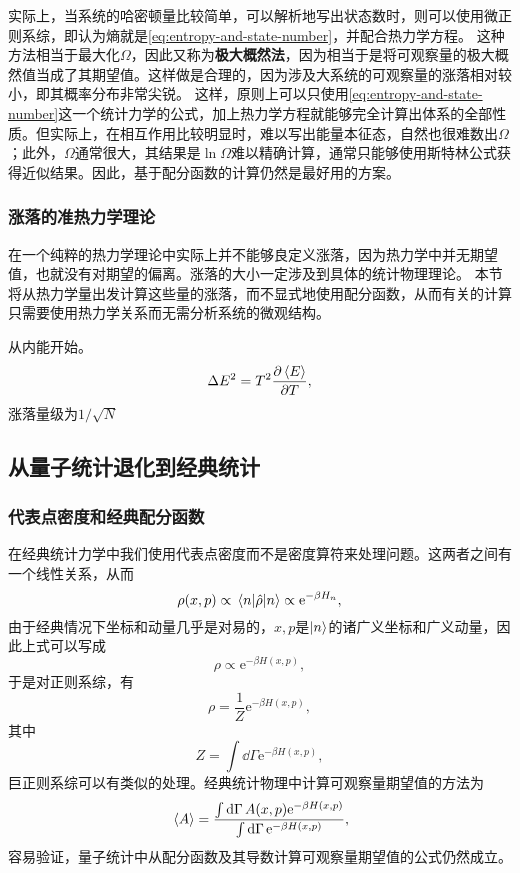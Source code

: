 \documentclass[hyperref, UTF8, a4paper]{ctexart}
\newcommand*{\ee}{\mathrm{e}}
\begin{document}
实际上，当系统的哈密顿量比较简单，可以解析地写出状态数时，则可以使用微正则系综，即认为熵就是\eqref{eq:entropy-and-state-number}，并配合热力学方程。
这种方法相当于最大化$\Omega$，因此又称为\textbf{极大概然法}，因为相当于是将可观察量的极大概然值当成了其期望值。这样做是合理的，因为涉及大系统的可观察量的涨落相对较小，即其概率分布非常尖锐。
这样，原则上可以只使用\eqref{eq:entropy-and-state-number}这一个统计力学的公式，加上热力学方程就能够完全计算出体系的全部性质。但实际上，在相互作用比较明显时，难以写出能量本征态，自然也很难数出$\Omega$；此外，$\Omega$通常很大，其结果是$\ln \Omega$难以精确计算，通常只能够使用斯特林公式获得近似结果。因此，基于配分函数的计算仍然是最好用的方案。

\subsubsection{涨落的准热力学理论}

在一个纯粹的热力学理论中实际上并不能够良定义涨落，因为热力学中并无期望值，也就没有对期望的偏离。涨落的大小一定涉及到具体的统计物理理论。
本节将从热力学量出发计算这些量的涨落，而不显式地使用配分函数，从而有关的计算只需要使用热力学关系而无需分析系统的微观结构。

从内能开始。
\begin{equation}
    \Delta E^2 = T^2 \pdv{\expval*{E}}{T},
\end{equation}
涨落量级为$1/\sqrt{N}$

\subsection{从量子统计退化到经典统计}

\subsubsection{代表点密度和经典配分函数}

在经典统计力学中我们使用代表点密度而不是密度算符来处理问题。这两者之间有一个线性关系，从而
\[
    \rho(x, p) \propto \mel{n}{\hat{\rho}}{n} \propto \ee^{- \beta H_n},
\]
由于经典情况下坐标和动量几乎是对易的，$x, p$是$\ket{n}$的诸广义坐标和广义动量，因此上式可以写成
\[
    \rho \propto \ee^{-\beta H(x, p)},
\]
于是对正则系综，有
\begin{equation}
    \rho = \frac{1}{Z} \ee^{- \beta H(x, p)},
\end{equation}
其中
\begin{equation}
    Z = \int \dd{\Gamma} \ee^{- \beta H(x, p)},
    \label{eq:classical-partition-function}
\end{equation}
巨正则系综可以有类似的处理。经典统计物理中计算可观察量期望值的方法为
\begin{equation}
    \expval*{A} = \frac{\int \dd{\Gamma} A(x, p) \ee^{-\beta H(x, p)}}{\int \dd{\Gamma} \ee^{-\beta H(x, p)}},
\end{equation}
容易验证，量子统计中从配分函数及其导数计算可观察量期望值的公式仍然成立。
\end{document}
